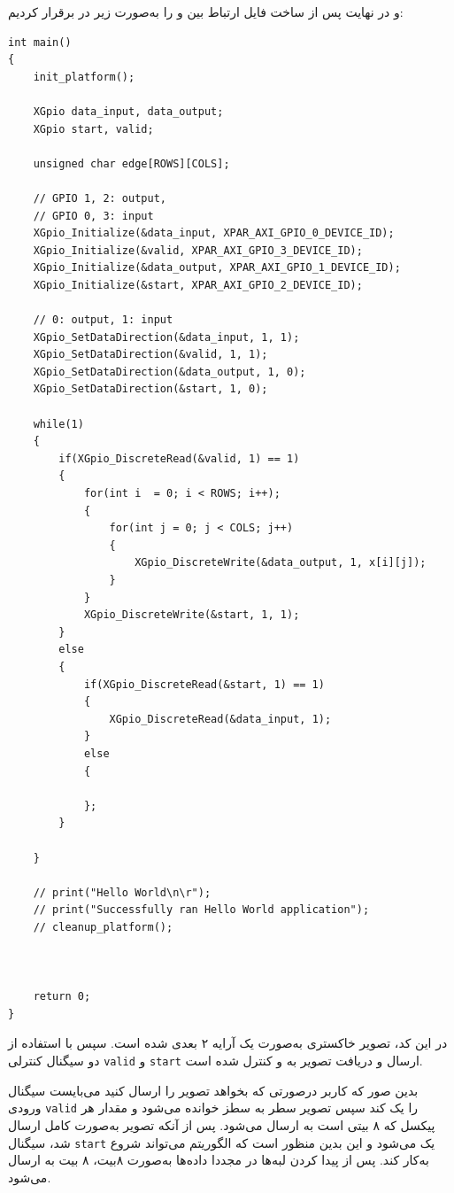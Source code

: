 و در نهایت پس از ساخت فایل  ارتباط بین  و  را به‌صورت زیر در  برقرار کردیم:


\begin{latin}
\begin{lstlisting}[caption={SW Edge Detector}]
int main()
{
	init_platform();
	
	XGpio data_input, data_output;
	XGpio start, valid;
	
	unsigned char edge[ROWS][COLS];
	
	// GPIO 1, 2: output,
	// GPIO 0, 3: input
	XGpio_Initialize(&data_input, XPAR_AXI_GPIO_0_DEVICE_ID);
	XGpio_Initialize(&valid, XPAR_AXI_GPIO_3_DEVICE_ID);
	XGpio_Initialize(&data_output, XPAR_AXI_GPIO_1_DEVICE_ID);
	XGpio_Initialize(&start, XPAR_AXI_GPIO_2_DEVICE_ID);
	
	// 0: output, 1: input
	XGpio_SetDataDirection(&data_input, 1, 1);
	XGpio_SetDataDirection(&valid, 1, 1);
	XGpio_SetDataDirection(&data_output, 1, 0);
	XGpio_SetDataDirection(&start, 1, 0);
	
	while(1)
	{
		if(XGpio_DiscreteRead(&valid, 1) == 1)
		{
			for(int i  = 0; i < ROWS; i++);
			{
				for(int j = 0; j < COLS; j++)
				{
					XGpio_DiscreteWrite(&data_output, 1, x[i][j]);
				}
			}
			XGpio_DiscreteWrite(&start, 1, 1);
		}
		else
		{
			if(XGpio_DiscreteRead(&start, 1) == 1)
			{
				XGpio_DiscreteRead(&data_input, 1);
			}
			else
			{
				
			};
		}
		
	}
	
	// print("Hello World\n\r");
	// print("Successfully ran Hello World application");
	// cleanup_platform();
	
	
	
	return 0;
}

\end{lstlisting}
\end{latin}




\begin{qsolve}
	در این کد، تصویر خاکستری به‌صورت یک آرایه ۲ بعدی  شده است. سپس با استفاده از دو سیگنال کنترلی \texttt{valid} و \texttt{start} ارسال و دریافت تصویر به  و  کنترل شده است.
	
	بدین صور که کاربر در‌صورتی که بخواهد تصویر را ارسال کنید می‌بایست سیگنال ورودی \texttt{valid} را یک کند سپس تصویر سطر به سطز خوانده می‌شود و مقدار هر پیکسل که ۸ بیتی است به  ارسال می‌شود. پس از آنکه تصویر به‌صورت کامل ارسال شد، سیگنال \texttt{start} یک می‌شود و این بدین منظور است که الگوریتم می‌تواند شروع به‌کار کند. پس از پیدا کردن لبه‌ها در  مجددا داده‌ها به‌صورت ۸بیت، ۸ بیت به  ارسال می‌شود.
	
\end{qsolve}





